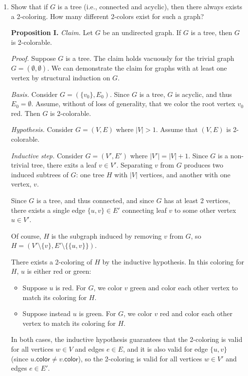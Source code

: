 \begin{enumerate}
    \item 
    Show that if $G$ is a tree (i.e., connected and acyclic), then there always exists a 2-coloring. How many different 2-colors exist for such a graph?

\begin{solution}

\textbf{Proposition I. }\textit{Claim. }Let $G$ be an undirected graph. If $G$ is a tree, then $G$ is 2-colorable.

\textit{Proof. }Suppose $G$ is a tree. The claim holds vacuously for the trivial graph $G=(\emptyset,\emptyset)$. We can demonstrate the claim for graphs with at least one vertex by structural induction on $G$.

\textit{Basis. }Consider $G=(\{v_0\},E_0)$. Since $G$ is a tree, $G$ is acyclic, and thus $E_0=\emptyset$. Assume, without of loss of generality, that we color the root vertex $v_0$ red. Then $G$ is 2-colorable.

\textit{Hypothesis. }Consider $G=(V,E)$ where $|V|>1$. Assume that $(V,E)$ is 2-colorable.

\textit{Inductive step. }Consider $G=(V',E')$ where $|V'|=|V|+1$. Since $G$ is a non-trivial tree, there exits a leaf $v\in V'$. Separating $v$ from $G$ produces two induced subtrees of $G$: one tree $H$ with $|V|$ vertices, and another with one vertex, $v$.

Since $G$ is a tree, and thus connected, and since $G$ has at least 2 vertices, there exists a single edge $\{u,v\}\in E'$ connecting leaf $v$ to some other vertex $u\in V'$.

Of course, $H$ is the subgraph induced by removing $v$ from $G$, so $H=(V'\setminus\{v\},E'\setminus\{\{u,v\}\})$.

There exists a 2-coloring of $H$ by the inductive hypothesis. In this coloring for $H$, $u$ is either red or green:
\begin{itemize}
\item Suppose $u$ is red. For $G$, we color $v$ green and color each other vertex to match its coloring for $H$.
\item Suppose instead $u$ is green. For $G$, we color $v$ red and color each other vertex to match its coloring for $H$.
\end{itemize}
In both cases, the inductive hypothesis guarantees that the 2-coloring is valid for all vertices $w\in V$ and edges $e\in E$, and it is also valid for edge $\{u,v\}$ (since $u.\mathsf{color}\neq v.\mathsf{color}$), so the 2-coloring is valid for all vertices $w\in V'$ and edges $e\in E'$.


\end{solution}
\end{enumerate}
